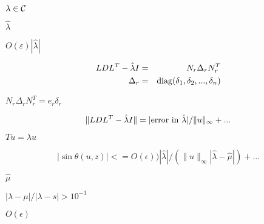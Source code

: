 {\newpage\clearpage
{}%
$\lambda \in {\cal C}$%
\lthtmlinlinemathZ
\lthtmlcheckvsize\clearpage}

{\newpage\clearpage
{}%
$\hat{\lambda}$%
\lthtmlinlinemathZ
\lthtmlcheckvsize\clearpage}

{\newpage\clearpage
{}%
$O( \varepsilon )
|\hat{\lambda}|$%
\lthtmlinlinemathZ
\lthtmlcheckvsize\clearpage}

{\newpage\clearpage
{}%
\begin{eqnarray*}
      LDL^T - \hat{\lambda} I &=& N_r \Delta_r N_r^T \\
         \Delta_r             &=& {\rm diag}(\delta_1,\delta_2, ...
,\delta_n)
\end{eqnarray*}%
\lthtmldisplayZ
\lthtmlcheckvsize\clearpage}

{\newpage\clearpage
{}%
$N_r \Delta_r N_r^T = e_r \delta_r$%
\lthtmlinlinemathZ
\lthtmlcheckvsize\clearpage}

{\newpage\clearpage
{}%
\begin{displaymath}
    \| LDL^T - \hat{\lambda} I \| =
     | {\rm error\ in\ } \hat{\lambda}| / \|u\|_{\infty} + ...
\end{displaymath}%
\lthtmldisplayZ
\lthtmlcheckvsize\clearpage}

{\newpage\clearpage
{}%
$Tu = \lambda u$%
\lthtmlinlinemathZ
\lthtmlcheckvsize\clearpage}

{\newpage\clearpage
{}%
\begin{displaymath}
   |\sin \theta(u,z)| <= O(\epsilon)
) |\hat{\lambda}| / (\|u\|_{\infty}
|\hat{\lambda} - \hat{\mu}| ) + ...
\end{displaymath}%
\lthtmldisplayZ
\lthtmlcheckvsize\clearpage}

{\newpage\clearpage
{}%
$\hat{\mu}$%
\lthtmlinlinemathZ
\lthtmlcheckvsize\clearpage}

{\newpage\clearpage
{}%
$|\lambda - \mu|/|\lambda - s| > 10^{-3}$%
\lthtmlinlinemathZ
\lthtmlcheckvsize\clearpage}

{\newpage\clearpage
{}%
$O(\epsilon)$%
\lthtmlinlinemathZ
\lthtmlcheckvsize\clearpage}

